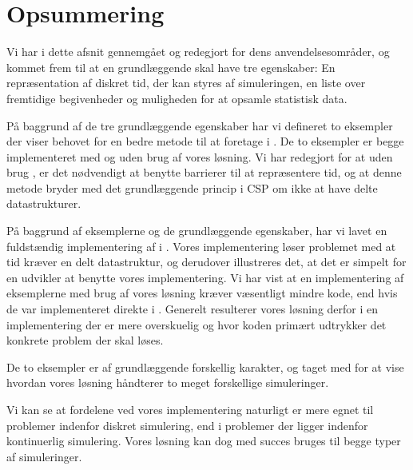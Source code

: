 \newpage\section{Opsummering}
Vi har i dette afsnit gennemgået \des og redegjort for dens anvendelsesområder, og kommet frem til at en \des grundlæggende skal have tre egenskaber: En repræsentation af diskret tid, der kan styres af simuleringen, en liste over fremtidige begivenheder og muligheden for at opsamle statistisk data. 

På baggrund af de tre grundlæggende egenskaber har vi defineret to eksempler der viser behovet for en bedre metode til at foretage \des i \pycsp. 
De to eksempler er begge implementeret med og uden brug af vores \des løsning. Vi har redegjort for at uden brug \des, er det nødvendigt at benytte barrierer til at repræsentere tid, og at denne metode bryder med det grundlæggende princip i CSP om ikke at have delte datastrukturer. 

På baggrund af eksemplerne og de grundlæggende egenskaber, har vi lavet en fuldstændig implementering af \des i \pycsp.
Vores implementering løser problemet med at tid kræver en delt datastruktur, og derudover illustreres det, at det er simpelt for en udvikler at benytte vores implementering. 
 Vi har vist  at en implementering af eksemplerne med brug af vores løsning kræver væsentligt mindre kode, end hvis de var implementeret direkte i \pycsp. Generelt resulterer vores løsning derfor i en implementering der er mere overskuelig og hvor koden primært udtrykker det konkrete problem der skal løses. 

De to eksempler er af grundlæggende forskellig karakter, og taget med for at vise hvordan vores løsning håndterer to meget forskellige simuleringer. 

Vi kan se at fordelene ved vores \des implementering naturligt er mere egnet til problemer indenfor diskret simulering, end i problemer der ligger indenfor kontinuerlig simulering. Vores løsning kan dog med succes bruges til begge typer af simuleringer. 


